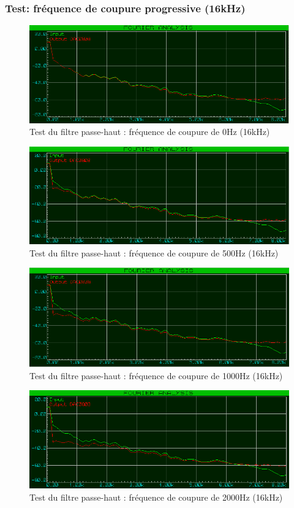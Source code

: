 \documentclass{article}
\begin{document}
    \subsubsection{Test: fréquence de coupure progressive (16kHz)}
    \begin{figure}[H]
        \centering
        \includegraphics[width=.75\textwidth]{./images/spectrum_high_pass_0_16k.png}
        \caption{Test du filtre passe-haut : fréquence de coupure de 0Hz (16kHz)}
    \end{figure}
    \begin{figure}[H]
        \centering
        \includegraphics[width=.75\textwidth]{./images/spectrum_high_pass_500_16k.png}
        \caption{Test du filtre passe-haut : fréquence de coupure de 500Hz (16kHz)}
    \end{figure}
    \begin{figure}[H]
        \centering
        \includegraphics[width=.75\textwidth]{./images/spectrum_high_pass_1000_16k.png}
        \caption{Test du filtre passe-haut : fréquence de coupure de 1000Hz (16kHz)}
    \end{figure}
    \begin{figure}[H]
        \centering
        \includegraphics[width=.75\textwidth]{./images/spectrum_high_pass_2000_16k.png}
        \caption{Test du filtre passe-haut : fréquence de coupure de 2000Hz (16kHz)}
    \end{figure}
\end{document}
